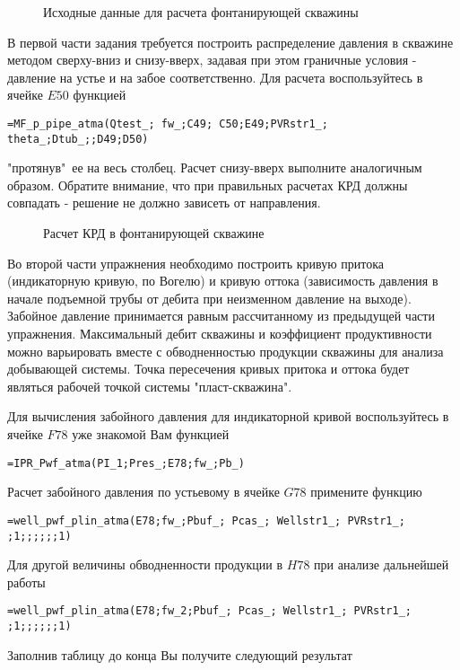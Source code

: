 \begin{figure}[h!]
	\center{\texttt{[image: Ex90\_1]}}
	\caption{Исходные данные для расчета фонтанирующей скважины}
	\label{ris:Ex90_1}
\end{figure}

В первой части задания требуется построить распределение давления в скважине методом сверху-вниз и снизу-вверх, задавая при этом граничные условия - давление на устье и на забое соответственно. Для расчета воспользуйтесь в ячейке $E50$ функцией

{ \small  \texttt{=MF\_p\_pipe\_atma(Qtest\_; fw\_;C49; C50;E49;PVRstr1\_; theta\_;Dtub\_;;D49;D50)
}}

"протянув"\ ее на весь столбец. Расчет снизу-вверх выполните аналогичным образом. Обратите внимание, что при правильных расчетах КРД должны совпадать - решение не должно зависеть от направления.

\begin{figure}[h!]
	\center{\texttt{[image: Ex90\_2]}}
	\caption{Расчет КРД в фонтанирующей скважине}
	\label{ris:Ex90_2}
\end{figure}

Во второй части упражнения необходимо построить кривую притока (индикаторную кривую, по Вогелю) и кривую оттока (зависимость давления в начале подъемной трубы от дебита при неизменном давление на выходе). Забойное давление принимается равным рассчитанному из предыдущей части упражнения. Максимальный дебит скважины и коэффициент продуктивности можно варьировать вместе с обводненностью продукции скважины для анализа добывающей системы. Точка пересечения кривых притока и оттока будет являться рабочей точкой системы "пласт-скважина".

Для вычисления забойного давления для индикаторной кривой воспользуйтесь в ячейке $F78$ уже знакомой Вам функцией

{ \small  \texttt{=IPR\_Pwf\_atma(PI\_1;Pres\_;E78;fw\_;Pb\_)}}

Расчет забойного давления по устьевому в ячейке $G78$ примените функцию
 
{ \small  \texttt{=well\_pwf\_plin\_atma(E78;fw\_;Pbuf\_; Pcas\_; Wellstr1\_; PVRstr1\_; ;1;;;;;;1)}} 

Для другой величины обводненности продукции в $H78$ при анализе дальнейшей работы

{ \small  \texttt{=well\_pwf\_plin\_atma(E78;fw\_2;Pbuf\_; Pcas\_; Wellstr1\_; PVRstr1\_; ;1;;;;;;1)}} 

Заполнив таблицу до конца Вы получите следующий результат

